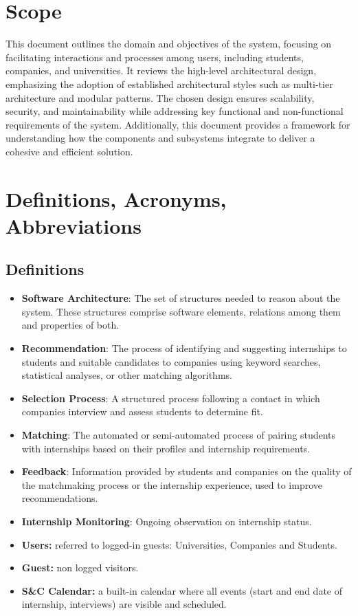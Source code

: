 \section{Scope}
\label{sec:scope}%

This document outlines the domain and objectives of the system, focusing on facilitating interactions and processes among users, including students, companies, and universities. It reviews the high-level architectural design, emphasizing the adoption of established architectural styles such as multi-tier architecture and modular patterns. The chosen design ensures scalability, security, and maintainability while addressing key functional and non-functional requirements of the system. Additionally, this document provides a framework for understanding how the components and subsystems integrate to deliver a cohesive and efficient solution.

\section{Definitions, Acronyms, Abbreviations}
\label{sec:definition_acronyms_abbreviations}%

\subsection{Definitions}
\label{subsec:definitions}%

\begin{itemize}
\item 
  \textbf{Software Architecture}: The set of structures needed to reason about the system. These structures comprise software elements, relations among them and properties of both.
\item
  \textbf{Recommendation}: The process of identifying and suggesting internships to students and suitable candidates to companies using keyword searches, statistical analyses, or other matching algorithms.
\item
  \textbf{Selection Process}: A structured process following a contact in which companies interview and assess students to determine fit.
\item
  \textbf{Matching}: The automated or semi-automated process of pairing students with internships based on their profiles and internship requirements.
\item
  \textbf{Feedback}: Information provided by students and companies on the quality of the matchmaking process or the internship experience, used to improve recommendations.
\item
  \textbf{Internship Monitoring}: Ongoing observation on internship status.
\item
  \textbf{Users:} referred to logged-in guests: Universities, Companies and Students.
\item
  \textbf{Guest:} non logged visitors.
\item
  \textbf{S\&C Calendar:} a built-in calendar where all events (start and end date of internship, interviews) are visible and scheduled.
\end{itemize}

